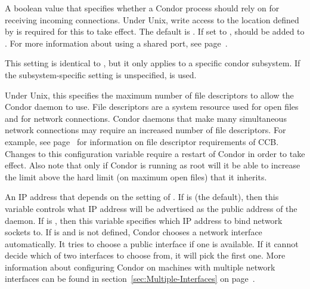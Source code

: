 \begin{description}
\label{param:UseSharedPort}
\item[\Macro{USE\_SHARED\_PORT}] A boolean value that
  specifies whether a Condor process should rely on
   for receiving incoming connections.  
  Under Unix, write access to the location defined by 
   is required for this to take
  effect.  The default is .  If set to ,
   should be added to .
  For more information about using
  a shared port, see page~\pageref{sec:Config-shared-port}.

\label{param:SubsysMaxFileDescriptors}
\item[\MacroB{<SUBSYS>\_MAX\_FILE\_DESCRIPTORS}]
This setting is identical to , but it
only applies to a specific condor subsystem.  If the
subsystem-specific setting is unspecified, 
is used.

\label{param:MaxFileDescriptors}
\item[\Macro{MAX\_FILE\_DESCRIPTORS}] Under Unix, this specifies the
maximum number of file descriptors to allow the Condor daemon to use.
File descriptors are a system resource used for open files and for
network connections.  Condor daemons that make many simultaneous
network connections may require an increased number of file
descriptors.  For example, see page~\pageref{sec:CCB} for information
on file descriptor requirements of CCB.  Changes to this configuration
variable require a restart of Condor in order to take effect.  Also note
that only if Condor is running as root will it be able to increase the
limit above the hard limit (on maximum open files) that it inherits.

\label{param:NetworkInterface}
\item[\Macro{NETWORK\_INTERFACE}]
  An IP address that depends on the setting of
  .  If 
  is  (the default), then this variable controls what IP
  address will be advertised as the public address of the daemon.
  If  is , then this variable
  specifies which IP address to bind network sockets to.
  If  is 
  and  is not defined,
  Condor chooses a network interface automatically.  It tries
  to choose a public interface if one is available.  If it cannot decide
  which of two interfaces to choose from, it will pick the first one.
  More information about configuring Condor on machines with multiple
  network interfaces can be found in
  section~\ref{sec:Multiple-Interfaces} on
  page~\pageref{sec:Multiple-Interfaces}.


\end{description}
